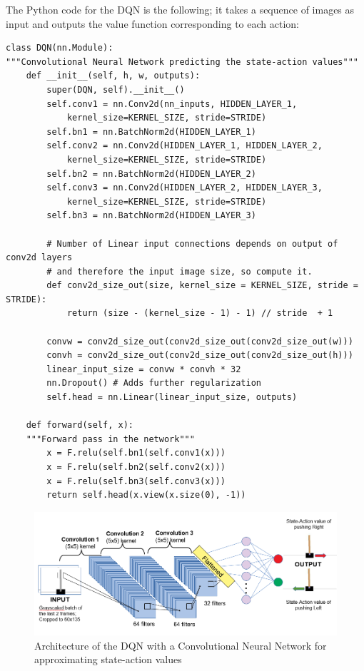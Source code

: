 \documentclass[11pt]{article}
\begin{document}
The Python code for the DQN is the following; it takes a sequence of images as input and outputs the value function corresponding to each action:
\begin{verbatim}
class DQN(nn.Module):
"""Convolutional Neural Network predicting the state-action values"""
    def __init__(self, h, w, outputs):
        super(DQN, self).__init__()
        self.conv1 = nn.Conv2d(nn_inputs, HIDDEN_LAYER_1, 
            kernel_size=KERNEL_SIZE, stride=STRIDE) 
        self.bn1 = nn.BatchNorm2d(HIDDEN_LAYER_1)
        self.conv2 = nn.Conv2d(HIDDEN_LAYER_1, HIDDEN_LAYER_2,
            kernel_size=KERNEL_SIZE, stride=STRIDE)
        self.bn2 = nn.BatchNorm2d(HIDDEN_LAYER_2)
        self.conv3 = nn.Conv2d(HIDDEN_LAYER_2, HIDDEN_LAYER_3,
            kernel_size=KERNEL_SIZE, stride=STRIDE)
        self.bn3 = nn.BatchNorm2d(HIDDEN_LAYER_3)
        
        # Number of Linear input connections depends on output of conv2d layers
        # and therefore the input image size, so compute it.
        def conv2d_size_out(size, kernel_size = KERNEL_SIZE, stride = STRIDE):
            return (size - (kernel_size - 1) - 1) // stride  + 1
            
        convw = conv2d_size_out(conv2d_size_out(conv2d_size_out(w)))
        convh = conv2d_size_out(conv2d_size_out(conv2d_size_out(h)))
        linear_input_size = convw * convh * 32
        nn.Dropout() # Adds further regularization
        self.head = nn.Linear(linear_input_size, outputs)

    def forward(self, x):
    """Forward pass in the network"""
        x = F.relu(self.bn1(self.conv1(x)))
        x = F.relu(self.bn2(self.conv2(x)))
        x = F.relu(self.bn3(self.conv3(x)))
        return self.head(x.view(x.size(0), -1))
\end{verbatim}


\begin{figure}
    \centering
    \includegraphics[width=\linewidth]{architecture.png}
    \caption{Architecture of the DQN with a Convolutional Neural Network for approximating state-action values}
    \label{fig:architecture}
\end{figure}
\end{document}
